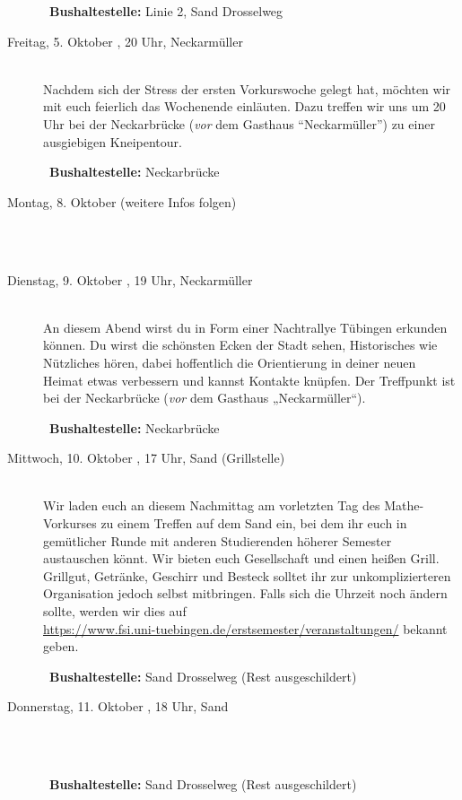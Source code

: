 \begin{description}
~\textbf{Bushaltestelle:} Linie 2, Sand Drosselweg
\fi
\fi


\item[Freitag, 5. Oktober \Jahr, 20 Uhr, Neckarmüller]\ \\
Nachdem sich der Stress der ersten Vorkurswoche gelegt hat, möchten wir mit euch feierlich das Wochenende einläuten. 
Dazu treffen wir uns um 20 Uhr bei der Neckarbrücke (\emph{vor} dem Gasthaus "`Neckarmüller"') zu einer ausgiebigen Kneipentour.

~\textbf{Bushaltestelle:} Neckarbrücke 


\ifkogwiss
\item[Montag, 8. Oktober \Jahr (weitere Infos folgen)]\ \\
~
\fi

\item[Dienstag, 9. Oktober \Jahr, 19 Uhr, Neckarmüller]\ \\ 
An diesem Abend wirst du in Form einer Nachtrallye Tübingen erkunden können. Du wirst die schönsten Ecken der Stadt sehen, Historisches wie Nützliches hören, dabei hoffentlich die Orientierung in deiner neuen Heimat etwas verbessern und kannst Kontakte knüpfen. Der Treffpunkt ist bei der Neckarbrücke (\emph{vor} dem Gasthaus „Neckarmüller“).

~\textbf{Bushaltestelle:} Neckarbrücke 

\item[Mittwoch, 10. Oktober \Jahr, 17 Uhr, Sand (Grillstelle)]\ \\
Wir laden euch an diesem Nachmittag am vorletzten Tag des Mathe-Vorkurses zu
einem Treffen auf dem Sand ein, bei dem ihr euch in gemütlicher Runde mit
anderen Studierenden höherer Semester austauschen könnt. Wir bieten euch
Gesellschaft und einen heißen Grill. Grillgut, Getränke, Geschirr und Besteck solltet ihr zur unkomplizierteren Organisation jedoch selbst mitbringen.
Falls sich die Uhrzeit noch ändern sollte, werden wir dies auf \\ \url{https://www.fsi.uni-tuebingen.de/erstsemester/veranstaltungen/} bekannt geben.

~\textbf{Bushaltestelle:} Sand Drosselweg (Rest ausgeschildert)

\item[Donnerstag, 11. Oktober \Jahr, 18 Uhr, Sand]\ \\
~%

~\textbf{Bushaltestelle:} Sand Drosselweg (Rest ausgeschildert)



\end{description}
